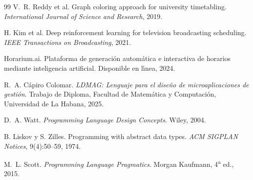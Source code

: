 \documentclass[12pt,a4paper]{report}
\theoremstyle{defstyle}
\begin{document}
\begin{thebibliography}{99}
V.~R. Reddy et al.
\newblock Graph coloring approach for university timetabling.
\newblock \textit{International Journal of Science and Research}, 2019.

H. Kim et al.
\newblock Deep reinforcement learning for television broadcasting scheduling.
\newblock \textit{IEEE Transactions on Broadcasting}, 2021.

{Horarium.ai}.
\newblock Plataforma de generaci\'on autom\'atica e interactiva de horarios
  mediante inteligencia artificial.
\newblock Disponible en l\'{\i}nea, 2024.

R.~A. C\'apiro Colomar.
\newblock \textit{{LDMAG}: Lenguaje para el dise\~no de microaplicaciones de
  gesti\'on}.
\newblock Trabajo de Diploma, Facultad de Matem\'atica y Computaci\'on,
  Universidad de La Habana, 2025.

D.~A. Watt.
\newblock \textit{Programming Language Design Concepts}.
\newblock Wiley, 2004.

B. Liskov y S. Zilles.
\newblock Programming with abstract data types.
\newblock \textit{ACM SIGPLAN Notices}, 9(4):50--59, 1974.

M.~L. Scott.
\newblock \textit{Programming Language Pragmatics}.
\newblock Morgan Kaufmann, 4\textsuperscript{a} ed., 2015.

\end{thebibliography}
\end{document}
